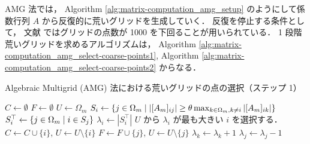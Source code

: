 AMG 法では，
Algorithm \ref{alg:matrix-computation_amg_setup}
のようにして係数行列 $A$ から反復的に荒いグリッドを生成していく．
反復を停止する条件として，
文献 \cite{Wolters2002} ではグリッドの点数が 1000 を下回ることが用いられている．
1 段階荒いグリッドを求めるアルゴリズムは，
Algorithm \ref{alg:matrix-computation_amg_select-coarse-points1},
Algorithm \ref{alg:matrix-computation_amg_select-coarse-points2}
からなる．

\begin{algorithm}[tp]
    \caption{Algebraic Multigrid (AMG) 法における荒いグリッドの点の選択（ステップ 1） \cite{Ruge1987}}
    \label{alg:matrix-computation_amg_select-coarse-points1}
    \begin{algorithmic}
        \State $C \gets \emptyset$
        \State $F \gets \emptyset$
        \State $U \gets \Omega_m$
        \State $S_i \gets \left\{j \in \Omega_m \relmiddle| %
            \left| [A_m]_{ij} \right| \ge \theta %
            \max_{k \in \Omega_m, k \neq i} \left| [A_m]_{ik} \right| \right\}$
        \Comment{$\theta$ は $\theta \in (0, 1]$ な定数}
        \EndFor
        \State $S_i^\top \gets \left\{ j \in \Omega_m \mathrel{}\middle|\mathrel{} i \in S_j \right\}$
        \State $\lambda_i \gets \left| S_i^\top \right|$
        \EndFor
        \State $U$ から $\lambda_i$ が最も大きい $i$ を選択する．
        \State $C \gets C \cup \{i\}$, $U \gets U \setminus \{i\}$
        \State $F \gets F \cup \{j\}$, $U \gets U \setminus \{j\}$
        \State $\lambda_k \gets \lambda_k + 1$
        \EndFor
        \EndFor
        \State $\lambda_j \gets \lambda_j - 1$
        \EndFor
        \EndWhile
        \EndProcedure
    \end{algorithmic}
\end{algorithm}

